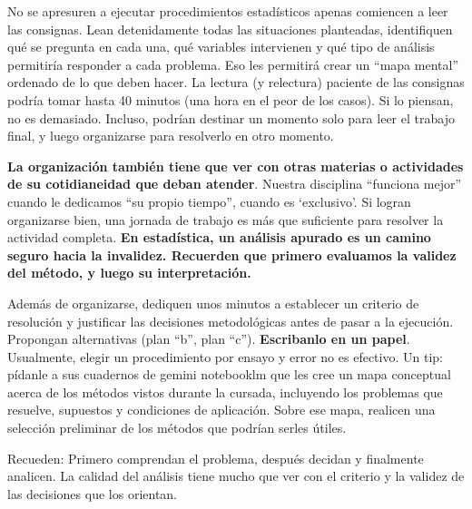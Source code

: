 \documentclass[
  spanish,
  letterpaper,
  DIV=11,
  numbers=noendperiod]{scrreprt}
\begin{document}
\begin{tcolorbox}[enhanced jigsaw, arc=.35mm, bottomrule=.15mm, bottomtitle=1mm, breakable, colback=white, colbacktitle=quarto-callout-tip-color!10!white, colframe=quarto-callout-tip-color-frame, coltitle=black, left=2mm, leftrule=.75mm, opacityback=0, opacitybacktitle=0.6, rightrule=.15mm, title=\textcolor{quarto-callout-tip-color}{\faLightbulb}\hspace{0.5em}{Antes de comenzar, tómense un tiempo para pensar}, titlerule=0mm, toprule=.15mm, toptitle=1mm]

No se apresuren a ejecutar procedimientos estadísticos apenas comiencen
a leer las consignas. Lean detenidamente todas las situaciones
planteadas, identifiquen qué se pregunta en cada una, qué variables
intervienen y qué tipo de análisis permitiría responder a cada problema.
Eso les permitirá crear un ``mapa mental'' ordenado de lo que deben
hacer. La lectura (y relectura) paciente de las consignas podría tomar
hasta 40 minutos (una hora en el peor de los casos). Si lo piensan, no
es demasiado. Incluso, podrían destinar un momento solo para leer el
trabajo final, y luego organizarse para resolverlo en otro momento.

\textbf{La organización también tiene que ver con otras materias o
actividades de su cotidianeidad que deban atender}. Nuestra disciplina
``funciona mejor'' cuando le dedicamos ``su propio tiempo'', cuando es
`exclusivo'. Si logran organizarse bien, una jornada de trabajo es más
que suficiente para resolver la actividad completa. \textbf{En
estadística, un análisis apurado es un camino seguro hacia la invalidez.
Recuerden que primero evaluamos la validez del método, y luego su
interpretación.}

Además de organizarse, dediquen unos minutos a establecer un criterio de
resolución y justificar las decisiones metodológicas antes de pasar a la
ejecución. Propongan alternativas (plan ``b'', plan ``c'').
\textbf{Escribanlo en un papel}. Usualmente, elegir un procedimiento por
ensayo y error no es efectivo. Un tip: pídanle a sus cuadernos de gemini
notebooklm que les cree un mapa conceptual acerca de los métodos vistos
durante la cursada, incluyendo los problemas que resuelve, supuestos y
condiciones de aplicación. Sobre ese mapa, realicen una selección
preliminar de los métodos que podrían serles útiles.

Recueden: Primero comprendan el problema, después decidan y finalmente
analicen. La calidad del análisis tiene mucho que ver con el criterio y
la validez de las decisiones que los orientan.

\end{tcolorbox}
\end{document}
